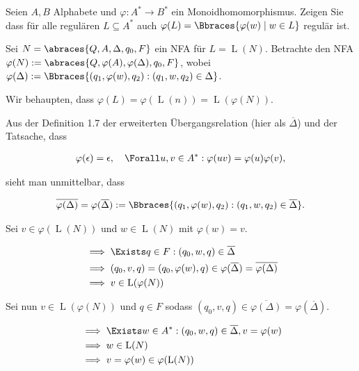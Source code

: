 
\begin{exercise}

Seien $A, B$ Alphabete und $\varphi: A^\ast \to B^\ast$ ein Monoidhomomorphismus.
Zeigen Sie dass für alle regulären $L \subseteq A^\ast$ auch $\varphi(L) = \Bbraces{\varphi(w) \mid w \in L}$ regulär ist.

\end{exercise}


\begin{solution}

Sei $N = \abraces{Q, A, \Delta, q_0, F}$ ein NFA für $L = \operatorname L(N)$.
Betrachte den NFA $\varphi(N) := \abraces{Q, \varphi(A), \varphi(\Delta), q_0, F}$, wobei $\varphi(\Delta) := \Bbraces{(q_1, \varphi(w), q_2): (q_1, w, q_2) \in \Delta}$.

Wir behaupten, dass $\varphi(L) = \varphi(\operatorname L(n)) = \operatorname L(\varphi(N))$.

Aus der Definition 1.7 der erweiterten Übergangsrelation (hier als $\overline \Delta$) und der Tatsache, dass

\begin{align*}
    \varphi(\epsilon) = \epsilon,
    \quad
    \Forall u, v \in A^\ast:
        \varphi(u v) = \varphi(u) \varphi(v),
\end{align*}

sieht man unmittelbar, dass

\begin{align*}
    \overline{\varphi(\Delta)}
    =
    \varphi(\overline \Delta)
    :=
    \Bbraces{(q_1, \varphi(w), q_2): (q_1, w, q_2) \in \overline \Delta}.
\end{align*}

Sei $v \in \varphi(\operatorname L(N))$ und $w \in \operatorname L(N)$ mit $\varphi(w) = v$.

\begin{align*}
    & \implies
    \Exists q \in F: (q_0, w, q) \in \overline \Delta \\
    & \implies
    (q_0, v, q) = (q_0, \varphi(w), q) \in \varphi(\overline \Delta) = \overline{\varphi(\Delta)} \\
    & \implies
    v \in \operatorname L(\varphi(N))
\end{align*}

Sei nun $v \in \operatorname L(\varphi(N))$ und $q \in F$ sodass $(q_0, v, q) \in \overline{\varphi(\Delta)} = \varphi(\overline \Delta)$.

\begin{align*}
    & \implies
    \Exists w \in A^\ast:
        (q_0, w, q) \in \overline \Delta,
        v = \varphi(w) \\
    & \implies
    w \in \operatorname L(N) \\
    & \implies
    v = \varphi(w) \in \varphi(\operatorname L(N))
\end{align*}

\end{solution}

